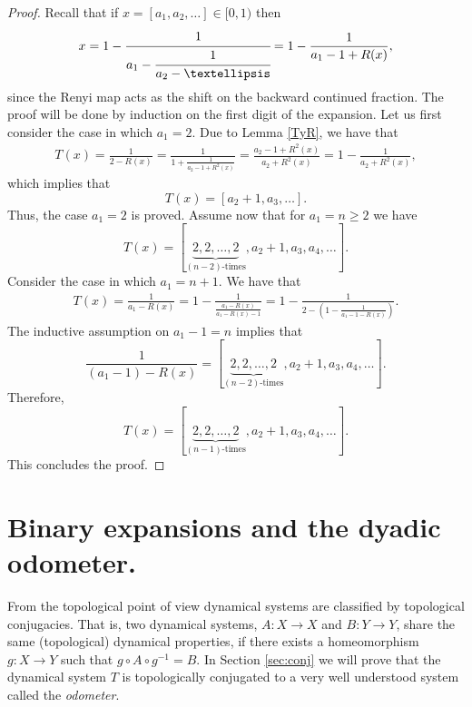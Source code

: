 \documentclass[letterpaper,10pt,reqno]{amsart}
\numberwithin{equation}{section}     %
\begin{document}
 \begin{proof}
Recall that if $x=[a_1, a_2,  \dots] \in [0,1)$ then
\begin{equation} \label{rep}
x=1- \textrm{ } \cfrac{1}{a_1 - \cfrac{1}{a_2 - \dots}}= 1 - \frac{1}{a_1- 1 + R(x)},
\end{equation}
since the Renyi map acts as the shift on the backward continued fraction.
The proof will be done by induction on the first digit of the expansion.  Let us first consider the case in which $a_1=2$. Due to Lemma \ref{TyR}, we have that
\begin{eqnarray*}
T(x) = \frac{1}{2- R(x)}
= \frac{1}{1 + \frac{1}{a_2-1+R^2(x)}}=
\frac{a_2-1+R^2(x)}{a_2 +R^2(x)}= 1 - \frac{1}{a_2 +R^2(x)},
\end{eqnarray*}
which implies that 
\begin{equation*}
T(x)= [a_2+1, a_3,  \dots].
\end{equation*}
Thus, the case $a_1=2$ is proved. Assume now that for $a_1=n\geq 2$ we have 
\begin{equation*}
T(x)=[\underbrace{2,2,\dots,2}_{(n-2)\textrm{-times}}, a_2+ 1, a_3, a_4, \dots].
\end{equation*}
Consider the case in which 
$a_1=n+1$. We have that
\begin{eqnarray*}
T(x)= \frac{1}{a_1-R(x)}= 1- \frac{1}{\frac{a_1-R(x)}{a_1-R(x)-1}}= 1- \frac{1}{2- \left(1 -\frac{1}{a_1-1-R(x)} \right)}.
\end{eqnarray*}
The inductive assumption on $a_1-1=n$ implies that
\begin{equation*}
\frac{1}{(a_1-1)-R(x)}=[\underbrace{2,2,\dots,2}_{(n-2)\textrm{-times}}, a_2+ 1, a_3, a_4, \dots].
\end{equation*}
Therefore,
\begin{equation*}
T(x)=[ \underbrace{2,2,\dots,2}_{(n-1)\textrm{-times}}, a_2+ 1, a_3, a_4, \dots].
\end{equation*}
This concludes the proof.
\end{proof}
 

 \section{Binary expansions and the dyadic odometer.}


 
From the topological point of view dynamical systems are classified by topological conjugacies. That is, two dynamical systems, $A:X \to X$ and $B:Y \to Y$, share the same (topological) dynamical properties, if there exists {{}{a}} homeomorphism $g: X\to Y$ such that $g \circ A \circ g^{-1}= B$. In Section \ref{sec:conj} we will prove that the dynamical system $T$ is topologically conjugated to a very well understood system called {{}{the}} \emph{odometer}.
\end{document}
